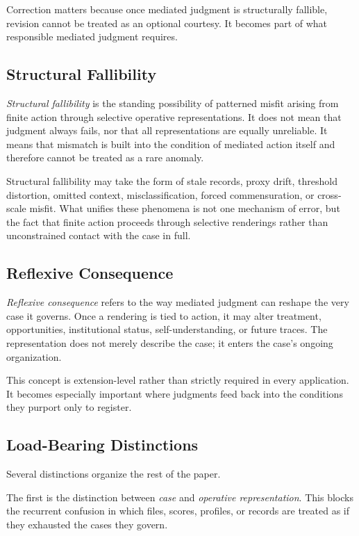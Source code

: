 \documentclass[11pt]{article}
\renewcommand{\emph}[1]{\textit{#1}}
\begin{document}
Correction matters because once mediated judgment is structurally fallible, revision cannot be treated as an optional courtesy. It becomes part of what responsible mediated judgment requires.

\subsection{Structural Fallibility}

\emph{Structural fallibility} is the standing possibility of patterned misfit arising from finite action through selective operative representations. It does not mean that judgment always fails, nor that all representations are equally unreliable. It means that mismatch is built into the condition of mediated action itself and therefore cannot be treated as a rare anomaly.

Structural fallibility may take the form of stale records, proxy drift, threshold distortion, omitted context, misclassification, forced commensuration, or cross-scale misfit. What unifies these phenomena is not one mechanism of error, but the fact that finite action proceeds through selective renderings rather than unconstrained contact with the case in full.

\subsection{Reflexive Consequence}

\emph{Reflexive consequence} refers to the way mediated judgment can reshape the very case it governs. Once a rendering is tied to action, it may alter treatment, opportunities, institutional status, self-understanding, or future traces. The representation does not merely describe the case; it enters the case's ongoing organization.\cite{Hacking1995LoopingEffects}

This concept is extension-level rather than strictly required in every application. It becomes especially important where judgments feed back into the conditions they purport only to register.

\subsection{Load-Bearing Distinctions}

Several distinctions organize the rest of the paper.

The first is the distinction between \emph{case} and \emph{operative representation}. This blocks the recurrent confusion in which files, scores, profiles, or records are treated as if they exhausted the cases they govern.
\end{document}
